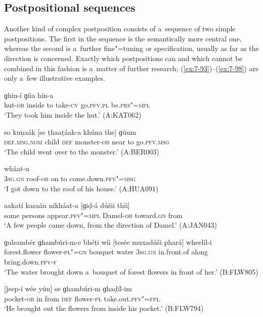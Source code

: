 \subsection{Postpositional sequences}
\label{subsec:7-2-4}

Another kind of complex postposition consists of a~sequence of two simple postpositions. The first in the sequence is the semantically more central one, whereas the second is a~further fine"=tuning or specification, usually as far as the direction is concerned. Exactly which postpositions can and which cannot be combined in this fashion is a~matter of further research; (\ref{ex:7-93})--(\ref{ex:7-98}) are only a~few illustrative examples.

\begin{exe}
\ex
\label{ex:7-93}
 ɡhin-í ɡíia hín-a \\
hut-\textsc{ob} inside to take-\textsc{cv} go.\textsc{pfv.pl} be.\textsc{prs"=mpl} \\
\glt `They took him inside the hut.' (A:KAT062)
\end{exe}
\begin{exe}
\ex
\label{ex:7-94}
\gll so kuṇaák [se ṭhaaṭáak-a khúna the] ɡúum \\
\textsc{def.msg.nom} child \textsc{def} monster-\textsc{ob} near to go.\textsc{pfv.msg} \\
\glt `The child went over to the monster.' (A:BER003)
\end{exe}
\begin{exe}
\ex
\label{ex:7-95}
 wháat-u \\
\textsc{3sg.gn} roof-\textsc{ob} on to come.down.\textsc{pfv"=msg}  \\
\glt `I got down to the roof of his house.' (A:HUA091)
\end{exe}
\begin{exe}
\ex
\label{ex:7-96}
\gll aakatí kasaán nikháat-a [ɡiḍ-á dúšii \textmd{thíi]} \\
some persons appear.\textsc{pfv"=mpl} Damel-\textsc{ob} toward.\textsc{gn} from \\
\glt `A few people came down, from the direction of Damel.' (A:JAN043)
\end{exe}
\begin{exe}
\ex
\label{ex:7-97}
\gll ɡulsambér ɡhambúri-m-e bhéṭi wíi [tesée muxadúši phará]
wheelíl-i \\
forest.flower flower-\textsc{pl"=gn} bouquet water \textsc{3sg.gn} in.front.of along bring.down.\textsc{pfv-f}\\
\glt `The water brought down a~bouquet of forest flowers in front of her.' (B:FLW805)
\end{exe}
\begin{exe}
\ex
\label{ex:7-98}
\gll \label{bkm:Ref193771773}[ǰeep-í wée yúu] se ɡhambúri-m ɡhaḍíl-im \\
pocket-\textsc{ob} in from \textsc{def} flower-\textsc{pl}  take.out.\textsc{pfv"=fpl} \\
\glt `He brought out the flowers from inside his pocket.' (B:FLW794)
\end{exe}

